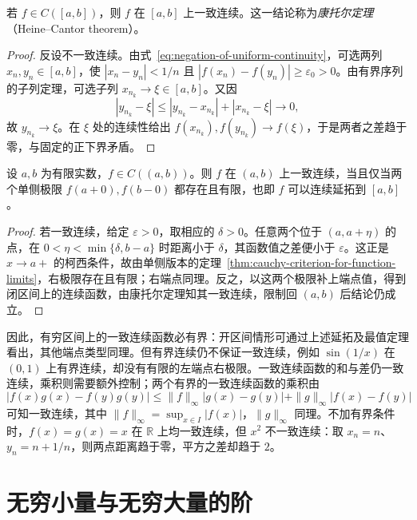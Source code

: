 \documentclass[UTF8,12pt,a4paper,fontset=fandol]{ctexbook}
\begin{document}
\begin{theorem}[康托尔定理]
\label{thm:heine-cantor-uniform-continuity}
若 $f\in C([a,b])$，则 $f$ 在 $[a,b]$ 上一致连续。这一结论称为\emph{康托尔定理}（Heine--Cantor theorem）。
\end{theorem}

\begin{proof}
反设不一致连续。由式~\eqref{eq:negation-of-uniform-continuity}，可选两列 $x_n,y_n\in[a,b]$，使 $|x_n-y_n|<1/n$ 且 $|f(x_n)-f(y_n)|\geq\varepsilon_0>0$。由有界序列的子列定理，可选子列 $x_{n_k}\to\xi\in[a,b]$。又因
\[
    |y_{n_k}-\xi|\leq|y_{n_k}-x_{n_k}|+|x_{n_k}-\xi|\to0,
\]
故 $y_{n_k}\to\xi$。在 $\xi$ 处的连续性给出 $f(x_{n_k}),f(y_{n_k})\to f(\xi)$，于是两者之差趋于零，与固定的正下界矛盾。
\end{proof}

\begin{proposition}[有穷开区间上的一致连续性]
\label{prop:uniform-continuity-and-endpoint-extension}
设 $a,b$ 为有限实数，$f\in C((a,b))$。则 $f$ 在 $(a,b)$ 上一致连续，当且仅当两个单侧极限 $f(a+0),f(b-0)$ 都存在且有限，也即 $f$ 可以连续延拓到 $[a,b]$。
\end{proposition}

\begin{proof}
若一致连续，给定 $\varepsilon>0$，取相应的 $\delta>0$。任意两个位于 $(a,a+\eta)$ 的点，在 $0<\eta<\min\{\delta,b-a\}$ 时距离小于 $\delta$，其函数值之差便小于 $\varepsilon$。这正是 $x\to a+$ 的柯西条件，故由单侧版本的定理~\ref{thm:cauchy-criterion-for-function-limits}，右极限存在且有限；右端点同理。反之，以这两个极限补上端点值，得到闭区间上的连续函数，由康托尔定理知其一致连续，限制回 $(a,b)$ 后结论仍成立。
\end{proof}

因此，有穷区间上的一致连续函数必有界：开区间情形可通过上述延拓及最值定理看出，其他端点类型同理。但有界连续仍不保证一致连续，例如 $\sin(1/x)$ 在 $(0,1)$ 上有界连续，却没有有限的左端点右极限。一致连续函数的和与差仍一致连续，乘积则需要额外控制；两个有界的一致连续函数的乘积由
\[
    |f(x)g(x)-f(y)g(y)|
    \leq\|f\|_\infty|g(x)-g(y)|+\|g\|_\infty|f(x)-f(y)|
\]
可知一致连续，其中 $\|f\|_\infty=\sup_{x\in I}|f(x)|$，$\|g\|_\infty$ 同理。不加有界条件时，$f(x)=g(x)=x$ 在 $\mathbb{R}$ 上均一致连续，但 $x^2$ 不一致连续：取 $x_n=n$、$y_n=n+1/n$，则两点距离趋于零，平方之差却趋于 $2$。

\section{无穷小量与无穷大量的阶}
\label{sec:orders-of-infinitesimals-and-infinities}
\end{document}
